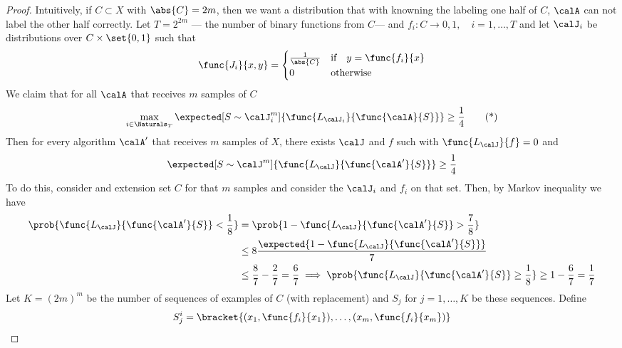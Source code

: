 \begin{proof}
    Intuitively, if \(C \subset X\) with \(\abs{C} = 2m\), then we want a distribution that with knowning the labeling one half of \(C\), \(\calA\) can not label the other half correctly. Let \(T = 2^{2m}\) --- the number of binary functions from \(C\)--- and \(f_i : C \to {0,1}, \quad i = 1 , \dots , T\) and let \(\calJ_i\) be distributions over \(C \times \set{0,1}\) such that 
    \begin{equation*}
        \func{J_i}{x,y} = \begin{cases}
            \frac{1}{\abs{C}} & \text{if} \quad y = \func{f_i}{x}\\
            0 & \text{otherwise}
        \end{cases}
    \end{equation*}
    We claim that for all \(\calA\) that receives \(m\) samples of \(C\)
    \begin{equation} \label{eq:NFLTstatement}
        \max_{i \in \Naturals_T} \expected[S \sim \calJ_i^m]{\func{L_{\calJ_i}}{\func{\calA}{S}}} \geq \dfrac{1}{4} \tag{*}
    \end{equation}
    Then for every algorithm \(\calA'\) that receives \(m\) samples of \(X\), there exists \(\calJ\) and \(f\) such with \(\func{L_{\calJ}}{f} = 0\) and 
    \begin{equation*}
        \expected[S \sim \calJ^m]{\func{L_{\calJ}}{\func{\calA'}{S}}} \geq \dfrac{1}{4}
    \end{equation*}
    To do this, consider and extension set \(C\) for that \(m\) samples and consider the \(\calJ_i\) and \(f_i\) on that set. Then, by Markov inequality we have 
    \begin{align*}
        \prob{\func{L_{\calJ}}{\func{\calA'}{S}} < \dfrac{1}{8}} &= \prob{1 - \func{L_{\calJ}}{\func{\calA'}{S}} > \dfrac{7}{8} }\\
        &\leq 8\dfrac{\expected{1 - \func{L_{\calJ}}{\func{\calA'}{S}}}}{7} \\
        &\leq \dfrac{8}{7} - \dfrac{2}{7} = \dfrac{6}{7}
        \implies \prob{\func{L_{\calJ}}{\func{\calA'}{S}} \geq \dfrac{1}{8}} \geq  1- \dfrac{6}{7} = \dfrac{1}{7}
    \end{align*}
    Let \(K = (2m)^m\) be the number of sequences of examples of \(C\) (with replacement) and \(S_j\) for \(j = 1, \dots , K\) be these sequences. Define 
    \begin{equation*}
        S_j^i = \bracket{(x_1 , \func{f_i}{x_1}), \dots , (x_m , \func{f_i}{x_m})}    
    \end{equation*}

\end{proof}
